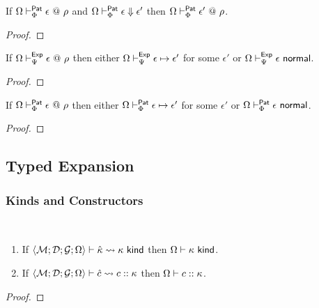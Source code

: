 \begin{theorem}
\label{thm:ppTSM-preservation-evaluation}
If $\Omega \vdash_{\Phi}^{\mathsf{Pat}} \epsilon ~@~ \rho$ and $\Omega \vdash_{\Phi}^\mathsf{Pat} \epsilon \Downarrow \epsilon'$ then $\Omega \vdash_{\Phi}^{\mathsf{Pat}} \epsilon' ~@~ \rho$.
\end{theorem}
\begin{proof}\end{proof}

\begin{theorem}
\label{thm:peTSM-progress}
If $\Omega \vdash_{\Psi}^{\mathsf{Exp}} \epsilon ~@~ \rho$ then either $\Omega \vdash_{\Psi}^\mathsf{Exp} \epsilon \mapsto \epsilon'$ for some $\epsilon'$ or $\Omega \vdash_{\Psi}^\mathsf{Exp} \epsilon~\mathsf{normal}$.
\end{theorem}
\begin{proof}\end{proof}

\begin{theorem}
\label{thm:ppTSM-progress}
If $\Omega \vdash_{\Phi}^{\mathsf{Pat}} \epsilon ~@~ \rho$ then either $\Omega \vdash_{\Phi}^\mathsf{Pat} \epsilon \mapsto \epsilon'$ for some $\epsilon'$ or $\Omega \vdash_{\Phi}^\mathsf{Pat} \epsilon~\mathsf{normal}$.
\end{theorem}
\begin{proof}\end{proof}

\subsection{Typed Expansion}
\subsubsection{Kinds and Constructors}
\begin{theorem}
\label{thm:kind-and-constructor-expansion-P}
~
\begin{enumerate}
\item If $\langle \mathcal{M}; \mathcal{D}; \mathcal{G}; \Omega \rangle \vdash {\hat\kappa} \leadsto \kappa~\mathsf{kind}$ then $\Omega \vdash \kappa~\mathsf{kind}$.
\item If $\langle \mathcal{M}; \mathcal{D}; \mathcal{G}; \Omega \rangle \vdash {\hat c} \leadsto c :: \kappa$ then $\Omega \vdash c :: \kappa$.
\end{enumerate}
\end{theorem}
\begin{proof}\end{proof}

